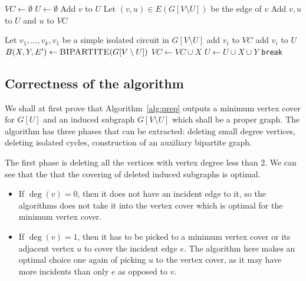 \begin{algorithm}[H]
\caption{Preparatory algorithm}
\label{alg:prep}
\small
\begin{algorithmic}[1]
    \State $ VC \gets \emptyset$
    \State $ U \gets \emptyset $
        \State Add $v$ to $U$
    \EndIf
        \State Let $(v, u) \in E(G[V \setminus U])$ be the edge of $v$
        \State Add $v, u$ to $U$ and $u$ to $VC$
    \EndIf
    \EndWhile

    \State Let $v_1, \dots, v_k, v_1$ be a simple isolated circuit in $G[V \setminus U]$
    \State add $v_i$ to $VC$
    \EndIf
    \State add $v_i$ to $U$
    \EndFor
    \EndWhile
    \State $B(X, Y, E') \gets \text{\textsc{BIPARTITE}($G[V \setminus U]$)}$
        \State $VC \gets VC \cup X$
        \State $U \gets U \cup X \cup Y$
    \EndIf
        \State \texttt{break}
    \EndIf
    \EndWhile
    \EndProcedure
\end{algorithmic}
\end{algorithm}

\subsection{Correctness of the algorithm}
We shall at first prove that Algorithm~\ref{alg:prep} outputs a minimum vertex cover
for $G[U]$ and an induced subgraph $G[V \setminus U]$ which shall be a proper graph.
The algorithm has three phases that can be extracted: deleting small degree vertices,
deleting isolated cycles, construction of an auxiliary bipartite graph.

The first phase is deleting all the vertices with vertex degree less than 2.
We can see that the that the covering of deleted induced subgraphs is optimal.
\begin{itemize}
    \item If $\deg(v) = 0$, then it does not have an incident edge to it, so 
        the algorithms does not take it into the vertex cover which is optimal
        for the minimum vertex cover.
    \item If $\deg(v) = 1$, then it has to be picked to a minimum vertex cover or 
        its adjacent vertex $u$ to cover the incident edge $e$. The algorithm here 
        makes an optimal choice one again of picking $u$ to the vertex cover, as 
        it may have more incidents than only $e$ as opposed to $v$.
\end{itemize}

